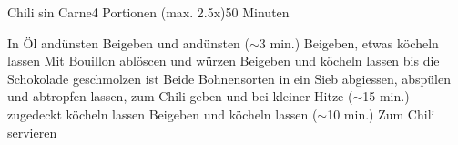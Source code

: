 \begin{recipe}{Chili sin Carne}{4 Portionen (max. 2.5x)}{50 Minuten}

In Öl andünsten
Beigeben und andünsten ($\sim$3 min.)
Beigeben, etwas köcheln lassen
Mit Bouillon ablöscen und würzen
Beigeben und köcheln lassen bis die Schokolade geschmolzen ist
Beide Bohnensorten in ein Sieb abgiessen, abspülen und abtropfen lassen, 
zum Chili geben und bei kleiner Hitze ($\sim$15 min.) zugedeckt köcheln lassen
Beigeben und köcheln lassen ($\sim$10 min.)
Zum Chili servieren

\end{recipe}
